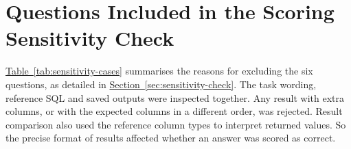 \clearpage
\section{Questions Included in the Scoring Sensitivity Check}
\label{app:scoring-sensitivity}

\hyperref[tab:sensitivity-cases]{Table~\ref*{tab:sensitivity-cases}}
summarises the reasons for excluding the six questions,
as detailed in
\hyperref[sec:sensitivity-check]{Section~\ref*{sec:sensitivity-check}}.
The task wording, reference SQL and saved outputs were inspected together.
Any result with extra columns, or with the expected columns in a different
order, was rejected.
Result comparison also used the reference column types to interpret returned values.
So the precise format of results affected whether an answer was scored as correct.

